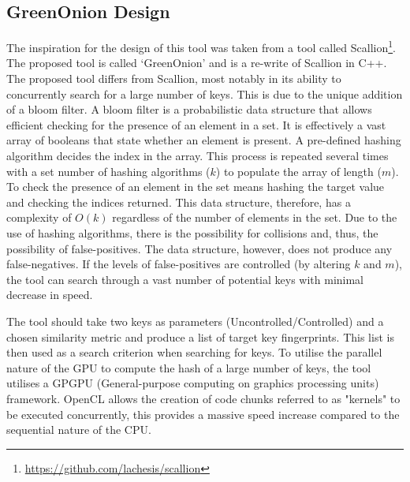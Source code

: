 \subsection{GreenOnion Design}

The inspiration for the design of this tool was taken from a tool called Scallion\footnote{\url{https://github.com/lachesis/scallion}}. The proposed tool is called `GreenOnion' and is a re-write of Scallion in C++.  The proposed tool differs from Scallion, most notably in its ability to concurrently search for a large number of keys. This is due to the unique addition of a bloom filter. A bloom filter is a probabilistic data structure that allows efficient checking for the presence of an element in a set. It is effectively a vast array of booleans that state whether an element is present. A pre-defined hashing algorithm decides the index in the array. This process is repeated several times with a set number of hashing algorithms ($k$) to populate the array of length ($m$). To check the presence of an element in the set means hashing the target value and checking the indices returned. This data structure, therefore, has a complexity of $O(k)$ regardless of the number of elements in the set. Due to the use of hashing algorithms, there is the possibility for collisions and, thus, the possibility of false-positives. The data structure, however, does not produce any false-negatives. If the levels of false-positives are controlled (by altering $k$ and $m$), the tool can search through a vast number of potential keys with minimal decrease in speed.

The tool should take two keys as parameters (Uncontrolled/Controlled) and a chosen similarity metric and produce a list of target key fingerprints. This list is then used as a search criterion when searching for keys. To utilise the parallel nature of the GPU to compute the hash of a large number of keys, the tool utilises a GPGPU (General-purpose computing on graphics processing units) framework. OpenCL allows the creation of code chunks referred to as "kernels" to be executed concurrently, this provides a massive speed increase compared to the sequential nature of the CPU.